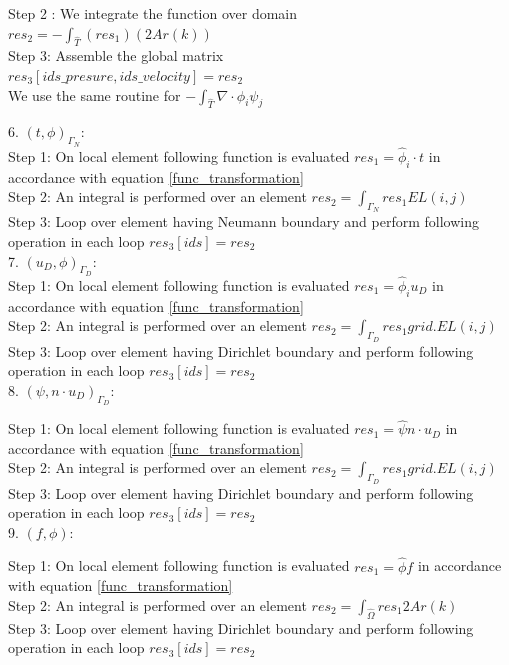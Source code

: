 \documentclass[a4paper]{book}
\begin{document}
Step 2 : We integrate the function over domain\\
$res_2 = -\int_{\hat{T}} (res_1) (2 Ar(k))$\\

Step 3: Assemble the global matrix\\
$res_3[ids\_presure,ids\_velocity] = res_2$\\

We use the same routine for $-\int_{\hat{T}} \nabla \cdot \phi_i \psi_j $

6. $(t,\phi)_{\Gamma_N}$:
\\

Step 1: On local element following function is evaluated $res_1=\hat{\phi}_i \cdot t$ in accordance with equation  \ref{func_transformation}\\
Step 2: An integral is performed over an element $res_2=\int_{\Gamma_N} res_1 EL(i,j) $\\
Step 3: Loop over element having Neumann boundary and perform following operation in each loop $res_3[ids]=res_2$\\

7. $(u_D,\phi)_{\Gamma_D}$:
\\
Step 1: On local element following function is evaluated $res_1=\hat{\phi}_i u_D$ in accordance with equation \ref{func_transformation}\\
Step 2: An integral is performed over an element $res_2=\int_{\Gamma_D} res_1 grid.EL(i,j) $\\
Step 3: Loop over element having Dirichlet boundary and perform following operation in each loop $res_3[ids]=res_2$\\

8. $(\psi, n \cdot u_D)_{\Gamma_D} $:

Step 1: On local element following function is evaluated $res_1=\hat{\psi} n\cdot u_D$ in accordance with equation \ref{func_transformation}\\
Step 2: An integral is performed over an element $res_2=\int_{\Gamma_D} res_1 grid.EL(i,j) $\\
Step 3: Loop over element having Dirichlet boundary and perform following operation in each loop $res_3[ids]=res_2$\\

9. $(f,\phi) $:

Step 1: On local element following function is evaluated $res_1= \hat{\phi} f$ in accordance with equation \ref{func_transformation}\\
Step 2: An integral is performed over an element $res_2=\int_{\hat{\Omega}} res_1 2 Ar(k)$\\
Step 3: Loop over element having Dirichlet boundary and perform following operation in each loop $res_3[ids]=res_2$\\
\end{document}

